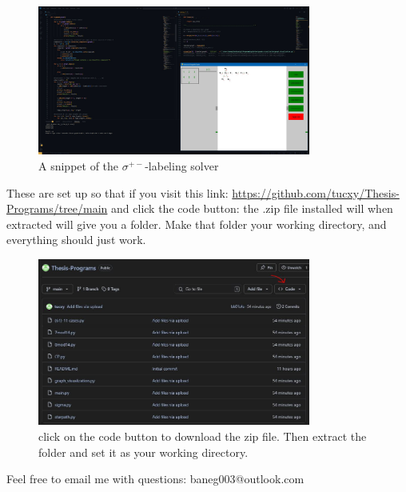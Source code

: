 \begin{figure}[H]
  \begin{center}
  \includegraphics[width=0.8\textwidth]{standalone/Images/CPsnippetlong.JPG}
  \caption{A snippet of the $\sigma^{+-}$-labeling solver}
  \label{fig:CPsnippet}
  \end{center}
\end{figure}


These are set up so that if you visit this link: \url{https://github.com/tucxy/Thesis-Programs/tree/main} and click the code button: the .zip file installed will when extracted will give you a folder. Make that folder your working directory, and everything should just work.

\begin{figure}[H]
  \begin{center}
  \includegraphics[width=0.8\textwidth]{standalone/Images/guide.JPG}
  \caption{click on the code button to download the zip file. Then extract the folder and set it as your working directory.}
  \label{fig:CPsnippet}
  \end{center}
\end{figure}

Feel free to email me with questions: baneg003@outlook.com